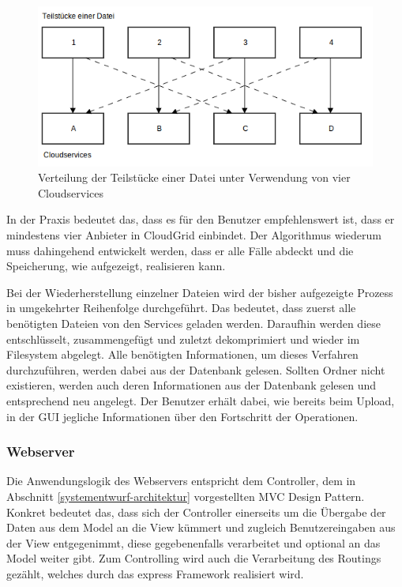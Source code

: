 \begin{figure}[H]
  \centering
  \includegraphics[scale=0.5]{resources/Bilder_Kapitel_4/split_3.png}
  \caption{Verteilung der Teilstücke einer Datei unter Verwendung von vier Cloudservices}
  \label{fig-verteilungcloud-split-3}
\end{figure}
\newpage
In der Praxis bedeutet das, dass es für den Benutzer empfehlenswert ist, dass er mindestens vier Anbieter in CloudGrid einbindet.
Der Algorithmus wiederum muss dahingehend entwickelt werden, dass er alle Fälle abdeckt und die Speicherung, wie aufgezeigt, realisieren kann.

Bei der Wiederherstellung einzelner Dateien wird der bisher aufgezeigte Prozess in umgekehrter Reihenfolge durchgeführt.
Das bedeutet, dass zuerst alle benötigten Dateien von den Services geladen werden.
Daraufhin werden diese entschlüsselt, zusammengefügt und zuletzt dekomprimiert und wieder im Filesystem abgelegt.
Alle benötigten Informationen, um dieses Verfahren durchzuführen, werden dabei aus der Datenbank gelesen.
Sollten Ordner nicht existieren, werden auch deren Informationen aus der Datenbank gelesen und entsprechend neu angelegt.
Der Benutzer erhält dabei, wie bereits beim Upload, in der \ac{GUI} jegliche Informationen über den Fortschritt der Operationen.

\subsubsection{Webserver}
\label{systementwurf-webserver}
Die Anwendungslogik des Webservers entspricht dem Controller, dem in Abschnitt \ref{systementwurf-architektur} vorgestellten \ac{MVC} Design Pattern.
Konkret bedeutet das, dass sich der Controller einerseits um die Übergabe der Daten aus dem Model an die View kümmert und zugleich Benutzereingaben aus der View entgegenimmt, diese gegebenenfalls verarbeitet und optional an das Model weiter gibt.
Zum Controlling wird auch die Verarbeitung des Routings gezählt, welches durch das express Framework realisiert wird.


